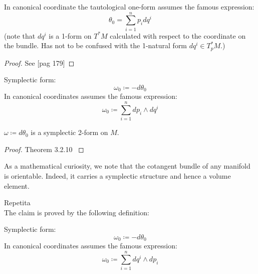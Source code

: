 \documentclass[a4paper,12pt]{scrartcl}    %
\begin{document}
	\begin{proposition}
		In canonical coordinate the tautological one-form assumes the famous expression:
		\begin{displaymath}
			\theta_0 = \sum_{i=1}^n p_i d q^i
		\end{displaymath}
		(note that $d q^i$ is a 1-form on $T^*M$ calculated with respect to the coordinate on the bundle. Has not to be confused with the 1-natural form $d q^i \in T^*_p M$.)
	\end{proposition}
	\begin{proof}
		See \cite{fomm}[pag 179]
	\end{proof}
	
		\begin{definition}
			Symplectic form:
			\begin{displaymath}
				\omega_0 \coloneqq -d \theta_0
			\end{displaymath}
			In canonical coordinates assumes the famous expression:
			\begin{displaymath}
				\omega_0 \coloneqq \sum_{i=1}^n d p_i \wedge d q^i
			\end{displaymath}
		\end{definition}
	
	\begin{proposition}
			$\omega \coloneqq d \theta_0$ is a symplectic 2-form on $M$.
	\end{proposition}
	\begin{proof}
	 Theorem 3.2.10 \cite{fomm}
	\end{proof}
	
	\begin{proposition}
	
	\end{proposition}
	
		As a mathematical curiosity, we note that the cotangent bundle of any manifold is orientable. Indeed, it carries a symplectic structure and hence a volume element.
		
		\danger Repetita \\
		The claim is proved by the following definition:
					\begin{definition}
						Symplectic form:
						\begin{displaymath}
							\omega_0 \coloneqq -d \theta_0
						\end{displaymath}
						In canonical coordinates assumes the famous expression:
						\begin{displaymath}
							\omega_0 \coloneqq \sum_{i=1}^n d q^i \wedge d p_i
						\end{displaymath}
					\end{definition}
\end{document}

